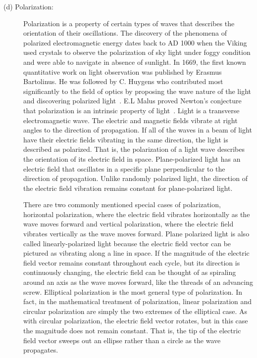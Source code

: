 \begin{description}
	\item[(d) Polarization: ]Polarization is a property of certain types of waves that describes the orientation of their oscillations. The discovery of the phenomena of polarized electromagnetic energy dates back to AD 1000 when the Viking used crystals to observe the polarization of sky light under foggy condition and were able to navigate in absence of sunlight. In 1669, the first known quantitative work on light observation was published by Erasmus Bartolinus. He was followed by C. Huygens who contributed most significantly to the field of optics by proposing the wave nature of the light and discovering polarized light~\citep{lee2009polarimetric}. E.L Malus proved Newton’s conjecture that polarization is an intrinsic property of light~\citep{konnen1985polarized}. Light is a transverse electromagnetic wave. The electric and magnetic fields vibrate at right angles to the direction of propagation.  If all of the waves in a beam of light have their electric fields vibrating in the same direction, the light is described as polarized. That is, the polarization of a light wave describes the orientation of its electric field in space. Plane-polarized light has an electric field that oscillates in a specific plane perpendicular to the direction of propagation. Unlike randomly polarized light, the direction of the electric field vibration remains constant for plane-polarized light. 
	
	There are two commonly mentioned special cases of polarization, horizontal polarization, where the electric field vibrates horizontally as the wave moves forward and vertical polarization, where the electric field vibrates vertically as the wave moves forward. Plane polarized light is also called linearly-polarized light because the electric field vector can be pictured as vibrating along a line in space. If the magnitude of the electric field vector remains constant throughout each cycle, but its direction is continuously changing, the electric field can be thought of as spiraling around an axis as the wave moves forward, like the threads of an advancing screw. Elliptical polarization is the most general type of polarization. In fact, in the mathematical treatment of polarization, linear polarization and circular polarization are simply the two extremes of the elliptical case. As with circular polarization, the electric field vector rotates, but in this case the magnitude does not remain constant. That is, the tip of the electric field vector sweeps out an ellipse rather than a circle as the wave propagates.
	

\end{description}
